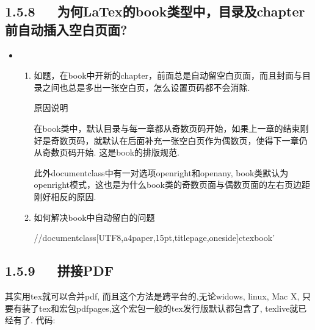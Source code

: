 \documentclass[letterpaper,12pt,english]{sphinxmanual}
\begin{document}
\subsection{1.5.8   为何LaTex的book类型中，目录及chapter前自动插入空白页面?}
\label{\detokenize{001software/001install/pandoc:latexbook-chapter}}\begin{itemize}
\item {} 
\begin{enumerate}
%
\item {} 
如题，在book中开新的chapter，前面总是自动留空白页面，而且封面与目录之间也总是多出一张空白页，怎么设置页码都不会消除.

原因说明

在book类中，默认目录与每一章都从奇数页码开始，如果上一章的结束刚好是奇数页码，就默认在后面补充一张空白页作为偶数页，使得下一章仍从奇数页码开始.
这是book的排版规范.

此外documentclass中有一对选项openright和openany,
book类默认为openright模式，这也是为什么book类的奇数页面与偶数页面的左右页边距刚好相反的原因.

\item {} 
如何解决book中自动留白的问题


//documentclass[UTF8,a4paper,15pt,titlepage,oneside]{ctexbook}'

\end{enumerate}

\end{itemize}


\subsection{1.5.9   拼接PDF}
\label{\detokenize{001software/001install/pandoc:id5}}
其实用tex就可以合并pdf, 而且这个方法是跨平台的,无论widows, linux, Mac X,
只要有装了tex和宏包pdfpages,这个宏包一般的tex发行版默认都包含了,
texlive就已经有了. 代码:
\end{document}
